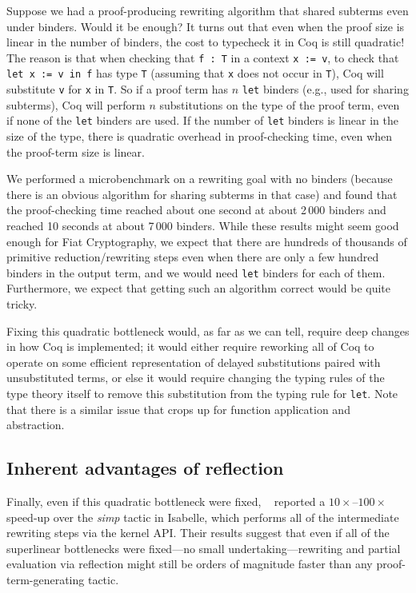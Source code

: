 \documentclass[a4paper,USenglish,cleveref,autoref,thm-restate]{lipics-v2021}
\newcommand{\citet}[1]{\usebibentry{#1}{citet}~\cite{#1}}
\begin{document}
\begin{minipage}[t][1cm]{\textwidth}
Suppose we had a proof-producing rewriting algorithm that shared subterms even under binders.
Would it be enough?
It turns out that even when the proof size is linear in the number of binders, the cost to typecheck it in Coq is still quadratic!
The reason is that when checking that \texttt{f : T} in a context \texttt{x := v}, to check that \texttt{let x := v in f} has type \texttt{T} (assuming that \texttt{x} does not occur in \texttt{T}), Coq will substitute \texttt{v} for \texttt{x} in \texttt{T}.
So if a proof term has $n$ \texttt{let} binders (e.g., used for sharing subterms), Coq will perform $n$ substitutions on the type of the proof term, even if none of the \texttt{let} binders are used.
If the number of \texttt{let} binders is linear in the size of the type, there is quadratic overhead in proof-checking time, even when the proof-term size is linear.

We performed a microbenchmark on a rewriting goal with no binders (because there is an obvious algorithm for sharing subterms in that case) and found that the proof-checking time reached about one second at about 2\,000 binders and reached 10 seconds at about 7\,000 binders.
While these results might seem good enough for Fiat Cryptography, we expect that there are hundreds of thousands of primitive reduction/rewriting steps even when there are only a few hundred binders in the output term, and we would need \texttt{let} binders for each of them.
Furthermore, we expect that getting such an algorithm correct would be quite tricky.

Fixing this quadratic bottleneck would, as far as we can tell, require deep changes in how Coq is implemented; it would either require reworking all of Coq to operate on some efficient representation of delayed substitutions paired with unsubstituted terms, or else it would require changing the typing rules of the type theory itself to remove this substitution from the typing rule for \texttt{let}.
Note that there is a similar issue that crops up for function application and abstraction.

\subsection{Inherent advantages of reflection}

Finally, even if this quadratic bottleneck were fixed, \citet{Aehlig} reported a $10\times$--$100\times$ speed-up over the \emph{simp} tactic in Isabelle, which performs all of the intermediate rewriting steps via the kernel API.
Their results suggest that even if all of the superlinear bottlenecks were fixed---no small undertaking---rewriting and partial evaluation via reflection might still be orders of magnitude faster than any proof-term-generating tactic.



\end{minipage}
\end{document}
